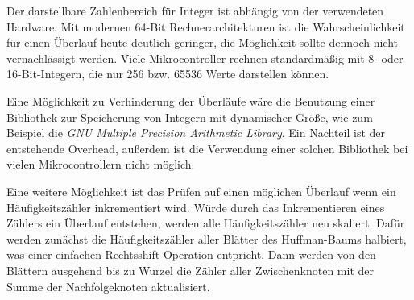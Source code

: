 \documentclass[twoside,11pt,a4paper]{article}
\theoremstyle{break}
\begin{document}
Der darstellbare Zahlenbereich für Integer ist abhängig von der
verwendeten Hardware. Mit modernen 64-Bit Rechnerarchitekturen ist die
Wahrscheinlichkeit für einen Überlauf heute deutlich geringer, die
Möglichkeit sollte dennoch nicht vernachlässigt werden. Viele
Mikrocontroller rechnen standardmäßig mit 8- oder 16-Bit-Integern, die
nur 256 bzw. 65536 Werte darstellen können.

Eine Möglichkeit zu Verhinderung der Überläufe wäre die Benutzung
einer Bibliothek zur Speicherung von Integern mit dynamischer Größe,
wie zum Beispiel die \emph{GNU Multiple Precision Arithmetic
  Library}. Ein Nachteil ist der entstehende Overhead, außerdem ist
die Verwendung einer solchen Bibliothek bei vielen Mikrocontrollern
nicht möglich. \cite{GMP}

Eine weitere Möglichkeit ist das Prüfen auf einen möglichen Überlauf
wenn ein Häufigkeitszähler inkrementiert wird. Würde durch das
Inkrementieren eines Zählers ein Überlauf entstehen, werden alle
Häufigkeitszähler neu skaliert. Dafür werden zunächst die
Häufigkeitszähler aller Blätter des Huffman-Baums halbiert, was einer
einfachen Rechtsshift-Operation entpricht. Dann werden von den
Blättern ausgehend bis zu Wurzel die Zähler aller Zwischenknoten mit
der Summe der Nachfolgeknoten aktualisiert.
\end{document}

